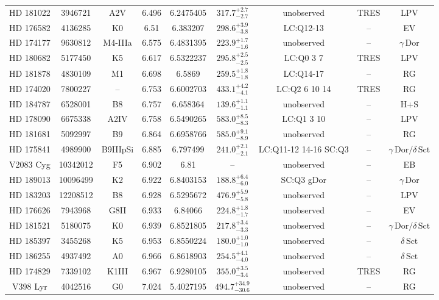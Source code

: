 \begin{table*}
\begin{tabular}{ccccccccc}
HD 181022 & 3946721 & A2V & 6.496 & 6.2475405 & $317.7^{+2.7}_{-2.7}$ & unobserved & TRES & LPV \\
HD 176582 & 4136285 & K0 & 6.51 & 6.383207 & $298.6^{+3.9}_{-3.8}$ & LC:Q12-13 & -- & EV \\
HD 174177 & 9630812 & M4-IIIa & 6.575 & 6.4831395 & $223.9^{+1.7}_{-1.6}$ & unobserved & -- & $\gamma\,\text{Dor}$ \\
HD 180682 & 5177450 & K5 & 6.617 & 6.5322237 & $295.8^{+2.5}_{-2.5}$ & LC:Q0 3 7 & TRES & LPV \\
HD 181878 & 4830109 & M1 & 6.698 & 6.5869 & $259.5^{+1.8}_{-1.8}$ & LC:Q14-17 & -- & RG \\
HD 174020 & 7800227 & -- & 6.753 & 6.6002703 & $433.1^{+4.2}_{-4.1}$ & LC:Q2 6 10 14 & TRES & RG \\
HD 184787 & 6528001 & B8 & 6.757 & 6.658364 & $139.6^{+1.1}_{-1.1}$ & unobserved & -- & H+S \\
HD 178090 & 6675338 & A2IV & 6.758 & 6.5490265 & $583.0^{+8.5}_{-8.3}$ & LC:Q1 3 10 & -- & LPV \\
HD 181681 & 5092997 & B9 & 6.864 & 6.6958766 & $585.0^{+9.1}_{-8.9}$ & unobserved & -- & RG \\
HD 175841 & 4989900 & B9IIIpSi & 6.885 & 6.797499 & $241.0^{+2.1}_{-2.1}$ & LC:Q11-12 14-16 SC:Q3 & -- & $\gamma\,\text{Dor} /\delta\,\text{Sct}$ \\
V2083 Cyg & 10342012 & F5 & 6.902 & 6.81 & -- & unobserved & -- & EB \\
HD 189013 & 10096499 & K2 & 6.922 & 6.8403153 & $188.8^{+6.4}_{-6.0}$ & SC:Q3 gDor & -- & $\gamma\,\text{Dor}$ \\
HD 183203 & 12208512 & B8 & 6.928 & 6.5295672 & $476.9^{+5.9}_{-5.8}$ & unobserved & -- & LPV \\
HD 176626 & 7943968 & G8II & 6.933 & 6.84066 & $224.8^{+1.8}_{-1.7}$ & unobserved & -- & EV \\
HD 181521 & 5180075 & K0 & 6.939 & 6.8521805 & $217.8^{+3.4}_{-3.3}$ & unobserved & -- & $\gamma\,\text{Dor} /\delta\,\text{Sct}$ \\
HD 185397 & 3455268 & K5 & 6.953 & 6.8550224 & $180.0^{+1.0}_{-1.0}$ & unobserved & -- & $\delta\,\text{Sct}$ \\
HD 186255 & 4937492 & A0 & 6.966 & 6.8618903 & $254.5^{+4.1}_{-4.0}$ & unobserved & -- & $\delta\,\text{Sct}$ \\
HD 174829 & 7339102 & K1III & 6.967 & 6.9280105 & $355.0^{+3.5}_{-3.4}$ & unobserved & TRES & RG \\
V398 Lyr & 4042516 & G0 & 7.024 & 5.4027195 & $494.7^{+34.9}_{-30.6}$ & unobserved & -- & RG \\

\end{tabular}
\end{table*}

